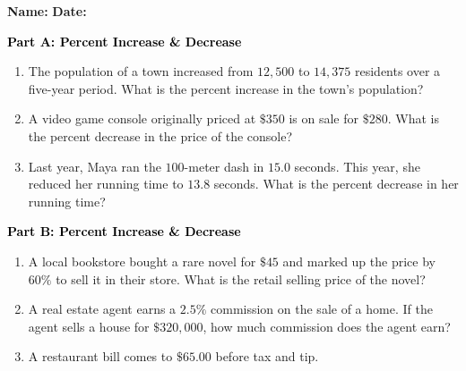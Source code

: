 \documentclass[12pt, letterpaper, fleqn]{article}
\begin{document}
\textbf{Name:} \underline{\hspace{5cm}}
\hfill
\textbf{Date:} \underline{\hspace{3cm}}\\

\begin{tcolorbox}[colback=customteal!20]
\large\textcolor{black}{\textbf{Part A: Percent Increase \& Decrease}}
\end{tcolorbox}

\vspace{3mm}

\begin{enumerate}[itemsep=5.5cm, leftmargin=0.6cm]
\item The population of a town increased from $12,500$ to $14,375$ residents over a five-year period. What is the percent increase in the town's population?
\item A video game console originally priced at $\$350$ is on sale for $\$280$. What is the percent decrease in the price of the console?
\item Last year, Maya ran the $100$-meter dash in $15.0$ seconds. This year, she reduced her running time to $13.8$ seconds. What is the percent decrease in her running time?
\end{enumerate}

\newpage

\begin{tcolorbox}[colback=customteal!20]
\large\textcolor{black}{\textbf{Part B: Percent Increase \& Decrease}}
\end{tcolorbox}

\vspace{3mm}

\begin{enumerate}[itemsep=5.5cm, leftmargin=0.6cm, resume]
\item A local bookstore bought a rare novel for $\$45$ and marked up the price by $60\%$ to sell it in their store. What is the retail selling price of the novel?
\item A real estate agent earns a $2.5\%$ commission on the sale of a home. If the agent sells a house for $\$320,000$, how much commission does the agent earn?
\item A restaurant bill comes to $\$65.00$ before tax and tip. 
\end{enumerate}
\end{document}

